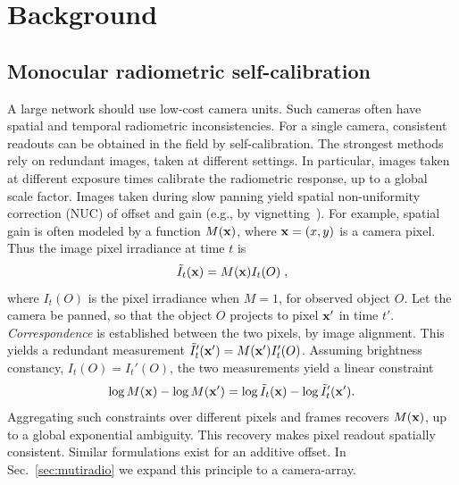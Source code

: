 \documentclass[runningheads]{llncs}
\begin{document}
\section{Background}
\label{sec:theory}


\subsection{Monocular radiometric self-calibration}
\label{sec:Signelradio}

A large network should use low-cost camera units. Such cameras often have spatial and temporal radiometric inconsistencies. For a single camera, consistent readouts can be obtained in the field by self-calibration. The strongest methods rely on redundant images, taken at different settings. In particular, images taken at different exposure times calibrate the radiometric response, up to a global scale factor. Images taken during slow panning yield spatial non-uniformity correction (NUC) of offset and gain (e.g., by vignetting~\cite{LitvinovCVPR05,Kang2000}). For example, spatial gain is often modeled by a function $M({\bf x})$, where \mbox{${\bf x}=(x,y)$} is a camera pixel. Thus the image pixel irradiance at time $t$ is
\begin{equation}
 \tilde{I}_t({\bf x}) = M({\bf x})I_t(O) \;,
 \label{eq:tilde_I}
\end{equation}
where $I_t(O)$ is the pixel irradiance when $M=1$, for observed object $O$. Let the camera be panned, so that the object $O$ projects to pixel ${\bf x}'$ in time $t'$.
{\em Correspondence} is established between the two pixels, by image alignment. This yields a redundant measurement $\tilde{I}_t'({\bf x}') = M({\bf x}')I_t'(O)$. Assuming brightness constancy, $I_t(O)=I_t'(O)$, the two measurements yield a linear constraint
\begin{equation}
 \log M({\bf x})- \log M({\bf x}')=\log \tilde{I}_t({\bf x})-\log \tilde{I}_t'({\bf x}').
 \label{eq:logM}
\end{equation}
Aggregating such constraints over different pixels and frames recovers $M({\bf x})$, up to a global exponential ambiguity. This recovery makes pixel readout spatially consistent. Similar formulations exist for an additive offset. In Sec.~\ref{sec:mutiradio} we expand this principle to a camera-array.



\end{document}
